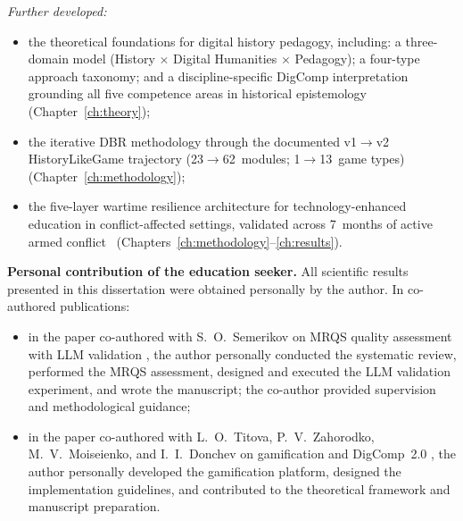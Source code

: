 {\textit{Further developed:}
\begin{itemize}
\item the theoretical foundations for digital history pedagogy, including: a three-domain
  model (History $\times$ Digital Humanities $\times$ Pedagogy); a four-type approach
  taxonomy; and a discipline-specific DigComp interpretation grounding all five competence
  areas in historical epistemology~\cite{KorniienkoSemerikov2024, Wineburg2001, Seixas2013}
  (Chapter~\ref{ch:theory});
\item the iterative DBR methodology through the documented v1$\to$v2 HistoryLikeGame
  trajectory (23$\to$62~modules; 1$\to$13~game types)~\cite{Reeves2003, Korniienko2024hlg}
  (Chapter~\ref{ch:methodology});
\item the five-layer wartime resilience architecture for technology-enhanced education in
  conflict-affected settings, validated across 7~months of active armed
  conflict~\cite{Ertmer1999, Burde2017, UNESCO2023} (Chapters~\ref{ch:methodology}--\ref{ch:results}).
\end{itemize}

\textbf{Personal contribution of the education seeker.} All scientific results presented in this dissertation were obtained personally by the author. In co-authored publications:
\begin{itemize}
\item in the paper co-authored with S.~O.~Semerikov on MRQS quality assessment with LLM validation \citep{Korniienko2025mrqs}, the author personally conducted the systematic review, performed the MRQS assessment, designed and executed the LLM validation experiment, and wrote the manuscript; the co-author provided supervision and methodological guidance;
\item in the paper co-authored with L.~O.~Titova, P.~V.~Zahorodko, M.~V.~Moiseienko, and I.~I.~Donchev on gamification and DigComp~2.0 \citep{Titova2025cte}, the author personally developed the gamification platform, designed the implementation guidelines, and contributed to the theoretical framework and manuscript preparation.
\end{itemize}

}
